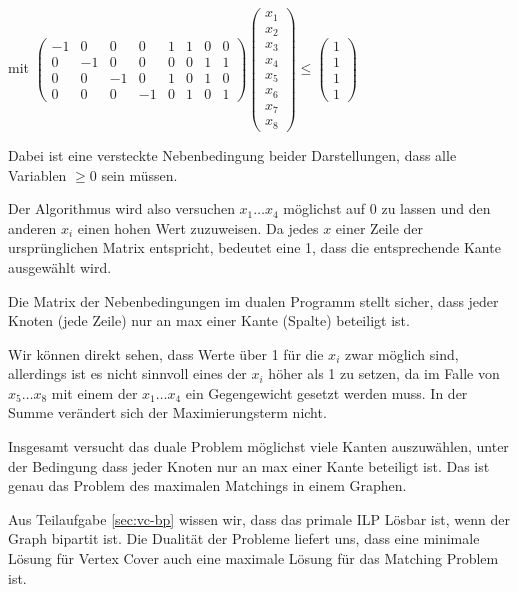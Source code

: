 mit 
$
\begin{pmatrix}
-1& 0 & 0 & 0 & 1 & 1 & 0 & 0 \\
0 &-1 & 0 & 0 & 0 & 0 & 1 & 1 \\
0 & 0 &-1 & 0 & 1 & 0 & 1 & 0 \\
0 & 0 & 0 &-1 & 0 & 1 & 0 & 1
\end{pmatrix}
\begin{pmatrix} x_1 \\ x_2 \\ x_3 \\ x_4 \\ x_5 \\ x_6 \\ x_7 \\ x_8 \end{pmatrix}
	\leq
\begin{pmatrix} 1 \\ 1 \\ 1 \\ 1 \end{pmatrix}$

Dabei ist eine versteckte Nebenbedingung beider Darstellungen, dass alle Variablen $\geq 0$ sein müssen.

Der Algorithmus wird also versuchen $x_1 \dots x_4$ möglichst auf 0 zu lassen und den anderen $x_i$ einen hohen Wert zuzuweisen. Da jedes $x$ einer Zeile der ursprünglichen Matrix entspricht, bedeutet eine 1, dass die entsprechende Kante ausgewählt wird.

Die Matrix der Nebenbedingungen im dualen Programm stellt sicher, dass jeder Knoten (jede Zeile) nur an max einer Kante (Spalte) beteiligt ist.

Wir können direkt sehen, dass Werte über 1 für die $x_i$ zwar möglich sind, allerdings ist es nicht sinnvoll eines der $x_i$ höher als 1 zu setzen, da im Falle von $x_5 \dots x_8$ mit einem der $x_1 \dots x_4$ ein Gegengewicht gesetzt werden muss. In der Summe verändert sich der Maximierungsterm nicht.

Insgesamt versucht das duale Problem möglichst viele Kanten auszuwählen, unter der Bedingung dass jeder Knoten nur an max einer Kante beteiligt ist. Das ist genau das Problem des maximalen Matchings in einem Graphen.

Aus Teilaufgabe \ref{sec:vc-bp} wissen wir, dass das primale ILP Lösbar ist, wenn der Graph bipartit ist. Die Dualität der Probleme liefert uns, dass eine minimale Lösung für Vertex Cover auch eine maximale Lösung für das Matching Problem ist.


